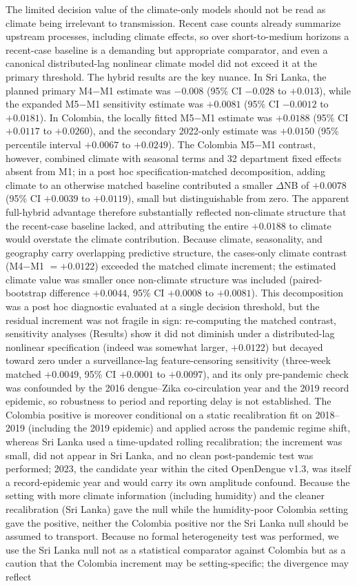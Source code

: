 \documentclass[11pt,a4paper]{article}
\begin{document}
The limited decision value of the climate-only models should not be read as climate being irrelevant to transmission. Recent case counts already summarize upstream processes, including climate effects, so over short-to-medium horizons a recent-case baseline is a demanding but appropriate comparator, and even a canonical distributed-lag nonlinear climate model did not exceed it at the primary threshold. The hybrid results are the key nuance. In Sri Lanka, the planned primary M4$-$M1 estimate was $-0.008$ (95\% CI $-0.028$ to $+0.013$), while the expanded M5$-$M1 sensitivity estimate was $+0.0081$ (95\% CI $-0.0012$ to $+0.0181$). In Colombia, the locally fitted M5$-$M1 estimate was $+0.0188$ (95\% CI $+0.0117$ to $+0.0260$), and the secondary 2022-only estimate was $+0.0150$ (95\% percentile interval $+0.0067$ to $+0.0249$). The Colombia M5$-$M1 contrast, however, combined climate with seasonal terms and 32 department fixed effects absent from M1; in a post hoc specification-matched decomposition, adding climate to an otherwise matched baseline contributed a smaller $\Delta$NB of $+0.0078$ (95\% CI $+0.0039$ to $+0.0119$), small but distinguishable from zero. The apparent full-hybrid advantage therefore substantially reflected non-climate structure that the recent-case baseline lacked, and attributing the entire $+0.0188$ to climate would overstate the climate contribution. Because climate, seasonality, and geography carry overlapping predictive structure, the cases-only climate contrast (M4$-$M1 $=+0.0122$) exceeded the matched climate increment; the estimated climate value was smaller once non-climate structure was included (paired-bootstrap difference $+0.0044$, 95\% CI $+0.0008$ to $+0.0081$). This decomposition was a post hoc diagnostic evaluated at a single decision threshold, but the residual increment was not fragile in sign: re-computing the matched contrast, sensitivity analyses (Results) show it did not diminish under a distributed-lag nonlinear specification (indeed was somewhat larger, $+0.0122$) but decayed toward zero under a surveillance-lag feature-censoring sensitivity (three-week matched $+0.0049$, 95\% CI $+0.0001$ to $+0.0097$), and its only pre-pandemic check was confounded by the 2016 dengue--Zika co-circulation year and the 2019 record epidemic, so robustness to period and reporting delay is not established. The Colombia positive is moreover conditional on a static recalibration fit on 2018--2019 (including the 2019 epidemic) and applied across the pandemic regime shift, whereas Sri Lanka used a time-updated rolling recalibration; the increment was small, did not appear in Sri Lanka, and no clean post-pandemic test was performed; 2023, the candidate year within the cited OpenDengue v1.3, was itself a record-epidemic year and would carry its own amplitude confound. Because the setting with more climate information (including humidity) and the cleaner recalibration (Sri Lanka) gave the null while the humidity-poor Colombia setting gave the positive, neither the Colombia positive nor the Sri Lanka null should be assumed to transport. Because no formal heterogeneity test was performed, we use the Sri Lanka null not as a statistical comparator against Colombia but as a caution that the Colombia increment may be setting-specific; the divergence may reflect 
\end{document}
